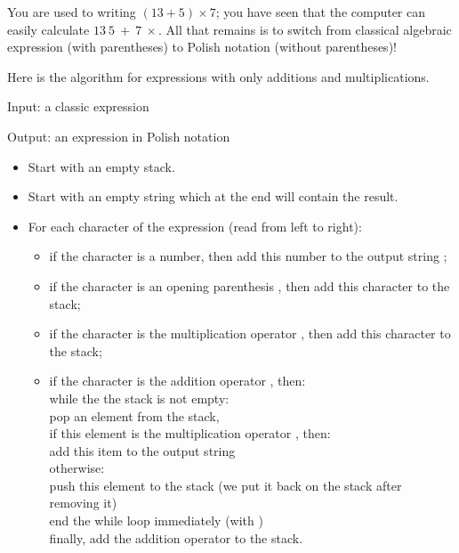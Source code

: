 \documentclass[11pt,class=report,crop=false]{standalone}
\begin{document}
\begin{activite}

 
 
You are used to writing \og{}$(13+5) \times 7$\fg{}; you have seen that the computer can easily calculate \og{}$13 \  5 \ + \ 7 \ \times$\fg{}. All that remains is to switch from classical algebraic expression (with parentheses) to Polish notation (without parentheses)!

  Here is the algorithm for expressions with only additions and multiplications. 
 
  \begin{algorithme}
  Input: a classic expression

  Output: an expression in Polish notation

  \begin{itemize}
    \item Start with an empty stack.  
    
    \item Start with an empty string  which at the end will contain the result.
   
   \item For each character of the expression (read from left to right):
   \begin{itemize} 
     \item if the character is a number, then add this number to the output string ;
     
     \item if the character is an opening parenthesis , then add this character to the stack;
     
     \item if the character is the multiplication operator , then add this character to the stack;  
        
     \item if the character is the addition operator , then: \\
     while the the stack is not empty: \\
     \indentation pop an element from the stack, \\
     \indentation if this element is the multiplication operator , then: \\
     \indentation \indentation add this item to the output string \\
     \indentation otherwise: \\
     \indentation \indentation push this element to the stack (we put it back on the stack after removing it)\\
     \indentation \indentation end the \og{}while\fg{} loop immediately  (with )\\              
     finally, add the  addition operator to the stack.


\end{itemize}
\end{itemize}
\end{algorithme}
\end{activite}
\end{document}
